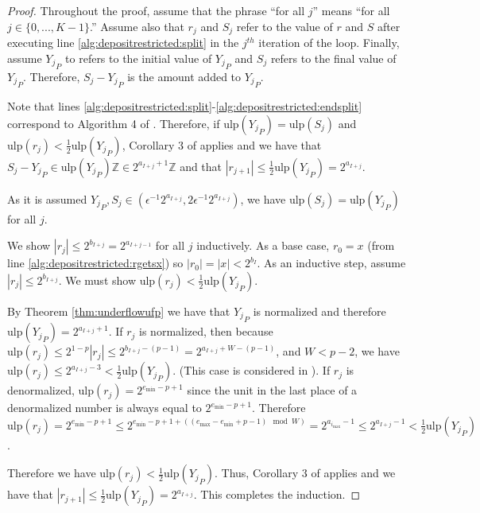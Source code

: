 \documentclass[12pt]{article}
\providecommand{\Z}{\ensuremath{\mathbb{Z}}}
\providecommand{\min}{\ensuremath{\text{min}}}
\providecommand{\max}{\ensuremath{\text{max}}}
\providecommand{\ulp}{\ensuremath{\text{ulp}}}
\theoremstyle{definition}
\numberwithin{equation}{section}
\numberwithin{figure}{section}
\begin{document}
      \begin{proof}
        Throughout the proof, assume that the phrase ``for all $j$'' means ``for all $j \in \{0, ..., K - 1\}$.'' Assume also that $r_j$ and $S_j$ refer to the value of $r$ and $S$ after executing line \ref{alg:depositrestricted:split} in the $j^{th}$ iteration of the loop. Finally, assume ${Y_j}_P$ to refers to the initial value of ${Y_j}_P$ and $S_j$ refers to the final value of ${Y_j}_P$. Therefore, $S_j - {Y_j}_P$ is the amount added to ${Y_j}_P$.

        Note that lines \ref{alg:depositrestricted:split}-\ref{alg:depositrestricted:endsplit} correspond to Algorithm 4 of \cite{repsum}.
        Therefore, if $\ulp({Y_j}_P) = \ulp(S_j)$ and $\ulp(r_j) < \frac{1}{2}\ulp({Y_j}_P)$, Corollary 3 of \cite{repsum} applies and we have that $S_j - {Y_j}_P \in \ulp({Y_j}_P)\Z \in 2^{a_{I + j} + 1}\Z$ and that $|r_{j + 1}| \leq \frac{1}{2}\ulp({Y_j}_P) = 2^{a_{I + j}}$.

        As it is assumed ${Y_j}_P, S_j \in (\epsilon^{-1}  2^{a_{I + j}}, 2  \epsilon^{-1}  2^{a_{I + j}})$, we have $\ulp(S_j) = \ulp({Y_j}_P)$ for all $j$.

        We show $|r_j| \leq 2^{b_{I + j}} = 2^{a_{I + j - 1}}$ for all $j$ inductively. As a base case, $r_0 = x$ (from line \ref{alg:depositrestricted:rgetsx}) so $|r_0| = |x| < 2^{b_{I}}$.
        As an inductive step, assume $|r_j| \leq 2^{b_{I + j}}$. We must show $\ulp(r_j) < \frac{1}{2}\ulp({Y_j}_P)$.

        By Theorem \ref{thm:underflowufp} we have that ${Y_j}_P$ is normalized and therefore $\ulp({Y_j}_P) = 2^{a_{I + j} + 1}$.
        If $r_j$ is normalized, then because $\ulp(r_j) \leq 2^{1 - p}|r_j| \leq 2^{b_{I + j} - (p - 1)} = 2^{a_{I + j} + W - (p - 1)}$, and $W < p - 2$, we have $\ulp(r_j) \leq 2^{a_{I + j} - 3} < \frac{1}{2}\ulp({Y_j}_P)$. (This case is considered in \cite{repsum}).
      If $r_j$ is denormalized, $\ulp(r_j) = 2^{e_{\min} - p + 1}$ since the unit in the last place of a denormalized number is always equal to $2^{e_{\min} - p + 1}$. Therefore $\ulp(r_j) = 2^{e_{\min} - p + 1} \leq 2^{e_{\min} - p + 1 + ((e_{\max} - e_{\min} + p - 1) \mod W)} = 2^{a_{i_{\max}} - 1} \leq 2^{a_{I + j} - 1} < \frac{1}{2}\ulp({Y_j}_P)$.

        Therefore we have $\ulp(r_j) < \frac{1}{2}\ulp({Y_j}_P)$. Thus, Corollary 3 of \cite{repsum} applies and we have that $|r_{j + 1}| \leq \frac{1}{2}\ulp({Y_j}_P) = 2^{a_{I + j}}$. This completes the induction.


\end{proof}
\end{document}
